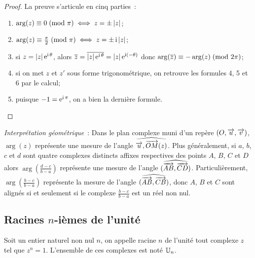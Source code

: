                       \begin{proof}
                        La preuve s'articule en cinq parties~:
                        \begin{enumerate}
                          \item \(\arg(z) \equiv 0\!\pmod {\pi} \iff z = \pm \left\lvert z\right\rvert\);
                          \item \(\arg(z) \equiv \frac{\pi}{2}\!\pmod {\pi} \iff z = \pm \operatorname{i} \left\lvert z\right\rvert\);
                          \item si \(z = \left\lvert z\right\rvert \operatorname{e}^{\operatorname{i} \theta}\), alors \(\overline{z} = 
                            \overline{|z| \operatorname{e}^{\operatorname{i} \theta}} = |z| \operatorname{e}^{\operatorname{i} (-\theta)}\) donc 
                            \(\arg(\overline{z}) \equiv -\arg(z)\!\pmod {2\pi}\);
                          \item si on met \(z\) et \(z'\) sous forme trigonométrique, on retrouve 
                            les formules 4, 5 et 6 par le calcul;
                          \item puisque \(-1 = \operatorname{e}^{\operatorname{i} \pi}\), on a bien la dernière formule.
                        \end{enumerate}
                      \end{proof}

                      \emph{Interprétation géométrique}~: Dans le plan complexe muni d'un repère 
                      \((O,\overrightarrow{u}, \overrightarrow{v})\), \(\arg(z)\) représente une mesure de l'angle 
                      \(\widehat{\overrightarrow{u}, \overrightarrow{OM}(z)}\). Plus généralement, si \(a\), \(b\), \(c\) 
                      et \(d\) sont quatre complexes distincts affixes respectives des points \(A\), 
                      \(B\), \(C\) et \(D\) alors \(\arg\left(\frac{d-c}{b-a}\right)\) représente une 
                      mesure de l'angle \((\widehat{\overrightarrow{AB},\overrightarrow{CD}})\). Particulièrement, 
                      \(\arg\left(\frac{b-c}{b-a}\right)\) représente la mesure de l'angle 
                      \((\widehat{\overrightarrow{AB},\overrightarrow{CB}})\), donc \(A\), \(B\) et \(C\) sont alignés si 
                      et seulement si le complexe \(\frac{b-c}{b-a}\) est un réel non nul.

                      \subsection{Racines \(n\)-ièmes de l'unité}
                      \label{subsec:racineunite}

                      \begin{defdef}
                        Soit un entier naturel non nul \(n\), on appelle racine \(n\)\iemes{} de 
                        l'unité tout complexe \(z\) tel que \(z^n = 1\). L'ensemble de ces complexes 
                        est noté \(\mathbb{U}_n\).
                      \end{defdef}

